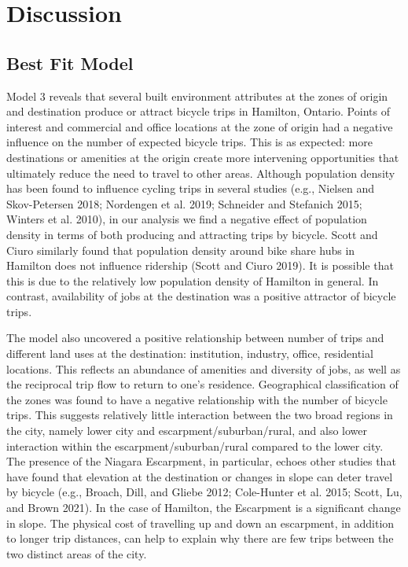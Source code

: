 \documentclass[smallextended]{svjour3}       %
\begin{document}
\hypertarget{sec:discussion}{%
\section{Discussion}\label{sec:discussion}}

\hypertarget{best-fit-model}{%
\subsection{Best Fit Model}\label{best-fit-model}}

Model 3 reveals that several built environment attributes at the zones
of origin and destination produce or attract bicycle trips in Hamilton,
Ontario. Points of interest and commercial and office locations at the
zone of origin had a negative influence on the number of expected
bicycle trips. This is as expected: more destinations or amenities at
the origin create more intervening opportunities that ultimately reduce
the need to travel to other areas. Although population density has been
found to influence cycling trips in several studies (e.g., Nielsen and
Skov-Petersen 2018; Nordengen et al. 2019; Schneider and Stefanich 2015;
Winters et al. 2010), in our analysis we find a negative effect of
population density in terms of both producing and attracting trips by
bicycle. Scott and Ciuro similarly found that population density around
bike share hubs in Hamilton does not influence ridership (Scott and
Ciuro 2019). It is possible that this is due to the relatively low
population density of Hamilton in general. In contrast, availability of
jobs at the destination was a positive attractor of bicycle trips.

The model also uncovered a positive relationship between number of trips
and different land uses at the destination: institution, industry,
office, residential locations. This reflects an abundance of amenities
and diversity of jobs, as well as the reciprocal trip flow to return to
one's residence. Geographical classification of the zones was found to
have a negative relationship with the number of bicycle trips. This
suggests relatively little interaction between the two broad regions in
the city, namely lower city and escarpment/suburban/rural, and also
lower interaction within the escarpment/suburban/rural compared to the
lower city. The presence of the Niagara Escarpment, in particular,
echoes other studies that have found that elevation at the destination
or changes in slope can deter travel by bicycle (e.g., Broach, Dill, and
Gliebe 2012; Cole-Hunter et al. 2015; Scott, Lu, and Brown 2021). In the
case of Hamilton, the Escarpment is a significant change in slope. The
physical cost of travelling up and down an escarpment, in addition to
longer trip distances, can help to explain why there are few trips
between the two distinct areas of the city.
\end{document}
